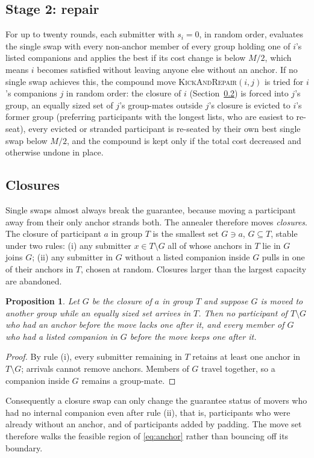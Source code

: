 \documentclass[11pt,a4paper]{article}
\theoremstyle{plain}
\newtheorem{proposition}[theorem]{Proposition}
\theoremstyle{definition}
\theoremstyle{remark}
\begin{document}
\subsection{Stage 2: repair}
For up to twenty rounds, each submitter with $s_i = 0$, in random order, evaluates the single swap with every non-anchor member of every group holding one of $i$'s listed companions and applies the best if its cost change is below $M/2$, which means $i$ becomes satisfied without leaving anyone else without an anchor. If no single swap achieves this, the compound move \textsc{KickAndRepair}$(i,j)$ is tried for $i$'s companions $j$ in random order: the closure of $i$ (Section~\ref{sec:closure}) is forced into $j$'s group, an equally sized set of $j$'s group-mates outside $j$'s closure is evicted to $i$'s former group (preferring participants with the longest lists, who are easiest to re-seat), every evicted or stranded participant is re-seated by their own best single swap below $M/2$, and the compound is kept only if the total cost decreased and otherwise undone in place.

\subsection{Closures}
\label{sec:closure}
Single swaps almost always break the guarantee, because moving a participant away from their only anchor strands both. The annealer therefore moves \emph{closures}. The closure of participant $a$ in group $T$ is the smallest set $G \ni a$, $G \subseteq T$, stable under two rules: (i) any submitter $x \in T \setminus G$ all of whose anchors in $T$ lie in $G$ joins $G$; (ii) any submitter in $G$ without a listed companion inside $G$ pulls in one of their anchors in $T$, chosen at random. Closures larger than the largest capacity are abandoned.

\begin{proposition}\label{prop:closure}
Let $G$ be the closure of $a$ in group $T$ and suppose $G$ is moved to another group while an equally sized set arrives in $T$. Then no participant of $T \setminus G$ who had an anchor before the move lacks one after it, and every member of $G$ who had a listed companion in $G$ before the move keeps one after it.
\end{proposition}
\begin{proof}
By rule (i), every submitter remaining in $T$ retains at least one anchor in $T \setminus G$; arrivals cannot remove anchors. Members of $G$ travel together, so a companion inside $G$ remains a group-mate.
\end{proof}
Consequently a closure swap can only change the guarantee status of movers who had no internal companion even after rule (ii), that is, participants who were already without an anchor, and of participants added by padding. The move set therefore walks the feasible region of \eqref{eq:anchor} rather than bouncing off its boundary.
\end{document}
